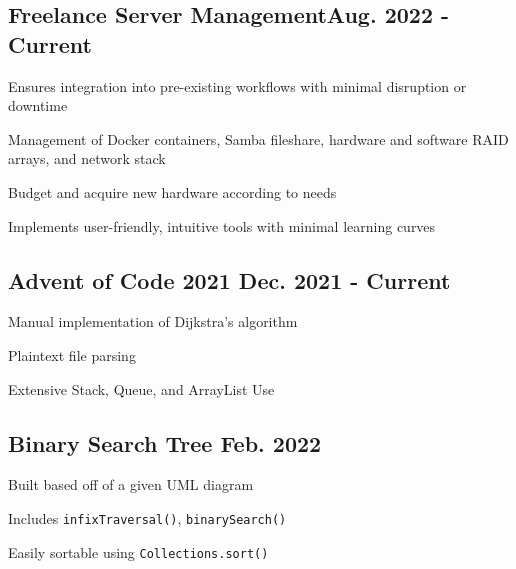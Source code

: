 \documentclass[letter,10pt]{article}
\begin{document}
\subsection{{Freelance Server Management\hfill Aug. 2022 - Current}}
\begin{zitemize}
	\item Ensures integration into pre-existing workflows with minimal disruption or downtime
    \item Management of Docker containers, Samba fileshare, hardware and software RAID arrays, and network stack
	\item Budget and acquire new hardware according to needs
    \item Implements user-friendly, intuitive tools with minimal learning curves
\end{zitemize}

\subsection{{Advent of Code 2021 \hfill Dec. 2021 - Current}}
\begin{zitemize}
	\item Manual implementation of Dijkstra's algorithm
	\item Plaintext file parsing
	\item Extensive Stack, Queue, and ArrayList Use
\end{zitemize}

\subsection{{Binary Search Tree \hfill Feb. 2022}}
\begin{zitemize}
	\item Built based off of a given UML diagram
	\item Includes \verb|infixTraversal()|, \verb|binarySearch()|
	\item Easily sortable using \verb|Collections.sort()|
\end{zitemize}

\end{document}
